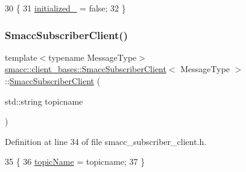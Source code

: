 \begin{DoxyCode}
30   \{
31     \hyperlink{classsmacc_1_1client__bases_1_1SmaccSubscriberClient_a2096c76f6464d0a513625cc53dba51ed}{initialized\_} = \textcolor{keyword}{false};
32   \}
\end{DoxyCode}
\mbox{\label{classsmacc_1_1client__bases_1_1SmaccSubscriberClient_a7e739a204fe5fe5b8cd7542758555e45}} 
\subsubsection{\texorpdfstring{Smacc\+Subscriber\+Client()}{SmaccSubscriberClient()}\hspace{0.1cm}{\footnotesize\ttfamily [2/2]}}
{\footnotesize\ttfamily template$<$typename Message\+Type$>$ \\
\hyperlink{classsmacc_1_1client__bases_1_1SmaccSubscriberClient}{smacc\+::client\+\_\+bases\+::\+Smacc\+Subscriber\+Client}$<$ Message\+Type $>$\+::\hyperlink{classsmacc_1_1client__bases_1_1SmaccSubscriberClient}{Smacc\+Subscriber\+Client} (\begin{DoxyParamCaption}\item[{std\+::string}]{topicname }\end{DoxyParamCaption})\hspace{0.3cm}{\ttfamily [inline]}}



Definition at line 34 of file smacc\+\_\+subscriber\+\_\+client.\+h.


\begin{DoxyCode}
35   \{
36     \hyperlink{classsmacc_1_1client__bases_1_1SmaccSubscriberClient_aeadf21a09412c6c9488e5acd50fb4f40}{topicName} = topicname;
37   \}
\end{DoxyCode}
\mbox{\label{classsmacc_1_1client__bases_1_1SmaccSubscriberClient_a91b9206c97b4acc76d4202639d24a53b}} 

